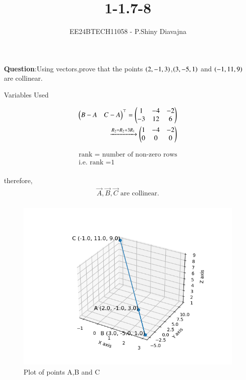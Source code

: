 \documentclass[journal]{IEEEtran}
\begin{document}

\vspace{3cm}

\title{1-1.7-8}
\author{EE24BTECH11058 - P.Shiny Diavajna}
{\let\newpage\relax\maketitle}

\renewcommand{\thefigure}{\theenumi}
\renewcommand{\thetable}{\theenumi}
\setlength{\intextsep}{10pt} %


\renewcommand{\thetable}{\theenumi}


\textbf{Question}:Using vectors,prove that the points $\left(2,-1,3\right)$,$\left(3,-5,1\right)$ and $\left(-1,11,9\right)$ are collinear. \\

\solution 
\begin{table}[h!]    
  \centering
  
  \caption{Variables Used}
  \label{tab1-1.7-8.1}
\end{table}

  \begin{align*}
	\begin{pmatrix}B-A & C-A\end{pmatrix}^\top =\begin{pmatrix}1 & -4 & -2 \\-3 & 12 &6\end{pmatrix}\\
	\xrightarrow{R_2=R_2+3R_1} \begin{pmatrix}1 & -4 &-2\\ 0 & 0 &0\end{pmatrix}\\ 
  \end{align*} 

  \begin{align*}
	\text{rank = number of non-zero rows}\\
	\text{i.e. rank =1}\\
  \end{align*}
	

therefore,\\ 
\begin{align*}	
	\vec{A}, \vec{B} , \vec{C} \text{ are collinear.}\\
\end{align*}



  \begin{figure}[h!]
   \centering
   \includegraphics[width=0.7\linewidth]{figs/Figure_3.png}
   \caption{Plot of points A,B and C}
  \end{figure}
\end{document}
